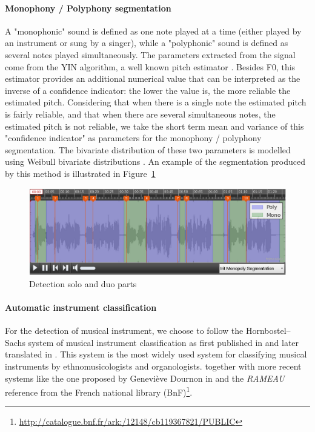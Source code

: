 \documentclass{sig-alternate}
\newcommand{\squeezeup}{\vspace{-2.5mm}}
\begin{document}
\squeezeup\paragraph{Monophony / Polyphony segmentation}
A "monophonic" sound is defined as one note played at a time (either played by an instrument or sung by a singer), while a "polyphonic" sound is defined as several notes played simultaneously. The parameters extracted from the signal come from the YIN algorithm, a well known pitch estimator \cite{DeCheveigne2002}. Besides F0, this estimator provides an additional numerical value that can be interpreted as the inverse of a confidence indicator: the lower the value is, the more reliable the estimated pitch. Considering that when there is a single note the estimated pitch is fairly reliable, and that when there are several simultaneous notes, the estimated pitch is not reliable, we take the short term mean and variance of this "confidence indicator" as parameters for the monophony / polyphony segmentation. The bivariate distribution of these two parameters is modelled using Weibull bivariate distributions \cite{Lachambre2011}.
An example of the segmentation produced by this method is illustrated in Figure~\ref{fig:Monopoly}
\begin{figure}[htb]
  \centering
\includegraphics[width=0.95\linewidth]{img/SOLO_DUOdetection.png} 
 \caption{Detection solo and duo parts}
  \label{fig:Monopoly}
\end{figure}

\squeezeup\paragraph{Automatic instrument classification}
For the detection of musical instrument, we choose to follow the Hornbostel–Sachs system of musical instrument classification as first published in \cite{taxonomy_sachs2} and later translated in \cite{taxonomy_sachs}. This system is the most widely used system for classifying musical instruments by ethnomusicologists and organologists. together with more recent systems like the one proposed by Geneviève Dournon in \cite{Dournon92} and the \emph{RAMEAU} reference from the French national library (BnF)\footnote{\url{http://catalogue.bnf.fr/ark:/12148/cb119367821/PUBLIC}}.
\end{document}
